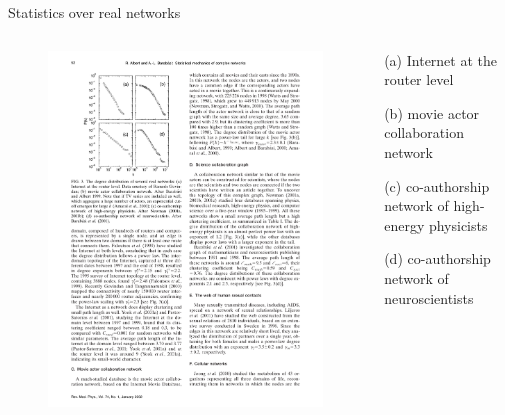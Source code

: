 \begin{frame}{Statistics over real networks}
\begin{columns}
\begin{column}{0.5\textwidth}
\begin{figure}
\includegraphics[width=\textwidth]{figs/08/scalefree}
\end{figure}
\end{column}
\begin{column}{0.5\textwidth}
\BI
\item[(a)] Internet at the router level
\item[(b)] movie actor collaboration network
\item[(c)] co-authorship network of high-energy physicists
\item[(d)] co-authorship network of neuroscientists
\EI
\end{column}
\end{columns}

\end{frame}

